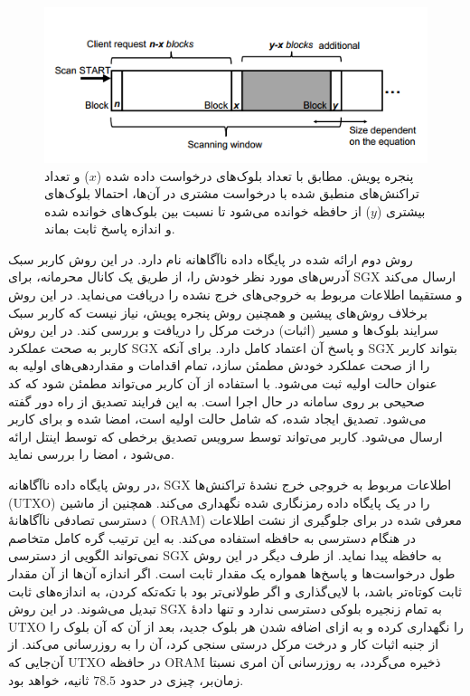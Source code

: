 \begin{figure}[h]
	\centering
	\includegraphics[width=0.7\linewidth]{image/Scanning_Window}
	\caption[پنجره پویش () ]{پنجره پویش. مطابق با تعداد بلوک‌های درخواست داده شده ($x$) و تعداد تراکنش‌های منطبق شده با درخواست مشتری در آن‌ها، احتمالا بلوک‌های بیشتری ($y$) از حافظه خوانده می‌شود تا نسبت بین بلوک‌های خوانده شده و اندازه پاسخ ثابت بماند\cite{Matetic2019}.}
	\label{fig:scanningwindow}
\end{figure}

روش دوم ارائه شده در \cite{Matetic2019} پایگاه داده ناآگاهانه نام دارد. در این روش کاربر سبک آدرس‌های مورد نظر خودش را، از طریق یک کانال محرمانه، برای SGX ارسال می‌کند و مستقیما اطلاعات مربوط به خروجی‌های خرج نشده را دریافت می‌نماید. در این روش برخلاف روش‌های پیشین و همچنین روش پنجره پویش،‌ نیاز نیست که کاربر سبک سرایند بلوک‌ها و مسیر (اثبات) درخت مرکل را دریافت و بررسی کند. در این روش کاربر به صحت عملکرد SGX و پاسخ آن اعتماد کامل دارد.
برای آنکه SGX بتواند کاربر را از صحت عملکرد خودش مطمئن سازد، 
تمام اقدامات و مقداردهی‌های اولیه به عنوان حالت اولیه ثبت می‌شود. با استفاده از آن کاربر می‌تواند مطمئن شود که کد صحیحی بر روی سامانه در حال اجرا است. به این فرایند تصدیق از راه دور
گفته می‌شود. تصدیق ایجاد شده، که شامل حالت اولیه است، امضا شده و برای کاربر ارسال می‌شود. کاربر می‌تواند توسط سرویس تصدیق برخطی که توسط اینتل ارائه می‌شود \cite{EPID}، امضا را بررسی نماید.

در روش پایگاه داده ناآگاهانه، SGX اطلاعات مربوط به خروجی خرج نشدهٔ تراکنش‌ها (UTXO) را در یک پایگاه داده رمزنگاری شده نگهداری می‌کند. همچنین از ماشین دسترسی تصادفی ناآگاهانهٔ
( ORAM)
معرفی شده در \cite{Stefanov2013} برای جلوگیری از نشت اطلاعات در هنگام دسترسی به حافظه استفاده می‌کند. به این ترتیب گره کامل متخاصم نمی‌تواند الگویی از دسترسی SGX به حافظه پیدا نماید. از طرف دیگر در این روش طول درخواست‌ها و پاسخ‌ها همواره یک مقدار ثابت است. اگر اندازه آن‌ها از آن مقدار ثابت کوتاه‌تر باشد، با لایی‌گذاری و اگر طولانی‌تر بود با تکه‌تکه کردن، به اندازه‌های ثابت تبدیل می‌شوند. در این روش SGX به تمام زنجیره بلوکی دسترسی ندارد و تنها دادهٔ UTXO را نگهداری کرده و به ازای اضافه شدن هر بلوک جدید، بعد از آن که آن بلوک را از جنبه اثبات کار و درخت مرکل درستی سنجی کرد، آن را به روزرسانی می‌کند. از آن‌جایی که UTXO در حافظه ORAM ذخیره می‌گردد، به روزرسانی آن امری نسبتا زمان‌بر، چیزی در حدود $78.5$ ثانیه، خواهد بود.


